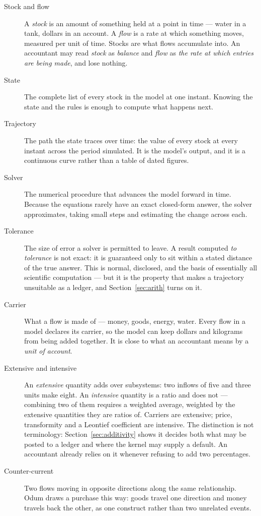 \documentclass[11pt,a4paper]{article}
\begin{document}
\begin{description}
\item[Stock and flow] A \emph{stock} is an amount of something held at a point in time --- water in a tank, dollars in an account. A \emph{flow} is a rate at which something moves, measured per unit of time. Stocks are what flows accumulate into. An accountant may read \emph{stock} as \emph{balance} and \emph{flow} as \emph{the rate at which entries are being made}, and lose nothing.
\item[State] The complete list of every stock in the model at one instant. Knowing the state and the rules is enough to compute what happens next.
\item[Trajectory] The path the state traces over time: the value of every stock at every instant across the period simulated. It is the model's output, and it is a continuous curve rather than a table of dated figures.
\item[Solver] The numerical procedure that advances the model forward in time. Because the equations rarely have an exact closed-form answer, the solver approximates, taking small steps and estimating the change across each.
\item[Tolerance] The size of error a solver is permitted to leave. A result computed \emph{to tolerance} is not exact: it is guaranteed only to sit within a stated distance of the true answer. This is normal, disclosed, and the basis of essentially all scientific computation --- but it is the property that makes a trajectory unsuitable as a ledger, and Section~\ref{sec:arith} turns on it.
\item[Carrier] What a flow is made of --- money, goods, energy, water. Every flow in a \gssk{} model declares its carrier, so the model can keep dollars and kilograms from being added together. It is close to what an accountant means by a \emph{unit of account}.
\item[Extensive and intensive] An \emph{extensive} quantity adds over subsystems: two inflows of five and three units make eight. An \emph{intensive} quantity is a ratio and does not --- combining two of them requires a weighted average, weighted by the extensive quantities they are ratios of. Carriers are extensive; price, transformity and a Leontief coefficient are intensive. The distinction is not terminology: Section~\ref{sec:additivity} shows it decides both what may be posted to a ledger and where the kernel may supply a default. An accountant already relies on it whenever refusing to add two percentages.
\item[Counter-current] Two flows moving in opposite directions along the same relationship. Odum draws a purchase this way: goods travel one direction and money travels back the other, as one construct rather than two unrelated events.

\end{description}
\end{document}
